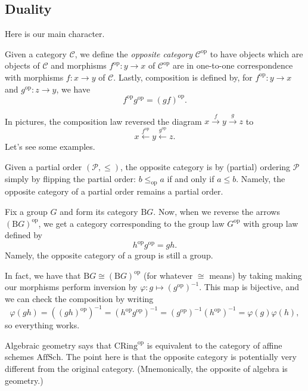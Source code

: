 \subsection{Duality}
Here is our main character.
\begin{definition}
	Given a category $\mathcal C$, we define the \textit{opposite category} $\mathcal C^{\mathrm{op}}$ to have objects which are objects of $\mathcal C$ and morphisms $f^{\mathrm{op}}:y\to x$ of $\mathcal C^{\mathrm{op}}$ are in one-to-one correspondence with morphisms $f:x\to y$ of $\mathcal C$. Lastly, composition is defined by, for $f^\mathrm{op}:y\to x$ and $g^{\mathrm{op}}:z\to y$, we have
	\[f^\mathrm{op}g^\mathrm{op}=(gf)^\mathrm{op}.\]
\end{definition}
In pictures, the composition law reversed the diagram $x\stackrel f\to y\stackrel g\to z$ to
\[x\stackrel{f^\mathrm{op}}\leftarrow y\stackrel{g^\mathrm{op}}\leftarrow z.\]
Let's see some examples.
\begin{example}
	Given a partial order $(\mathcal P,\le)$, the opposite category is by (partial) ordering $\mathcal P$ simply by flipping the partial order: $b\le_\mathrm{op}a$ if and only if $a\le b$. Namely, the opposite category of a partial order remains a partial order.
\end{example}
\begin{example}
	Fix a group $G$ and form its category $\mathrm BG$. Now, when we reverse the arrows $(\mathrm BG)^{\mathrm{op}}$, we get a category corresponding to the group law $G^\mathrm{op}$ with group law defined by
	\[h^\mathrm{op}g^\mathrm{op}=gh.\]
	Namely, the opposite category of a group is still a group.
\end{example}
In fact, we have that $\mathrm BG\cong(\mathrm BG)^\mathrm{op}$ (for whatever $\cong$ means) by taking making our morphisms perform inversion by $\varphi:g\mapsto (g^\mathrm{op})^{-1}$. This map is bijective, and we can check the composition by writing
\[\varphi(gh)=\left((gh)^\mathrm{op}\right)^{-1}=\left(h^\mathrm{op}g^\mathrm{op}\right)^{-1}=\left(g^\mathrm{op}\right)^{-1}\left(h^\mathrm{op}\right)^{-1}=\varphi(g)\varphi(h),\]
so everything works.
\begin{example}
	Algebraic geometry says that $\mathrm{CRing}^\mathrm{op}$ is equivalent to the category of affine schemes $\mathrm{AffSch}$. The point here is that the opposite category is potentially very different from the original category. (Mnemonically, the opposite of algebra is geometry.)
\end{example}
